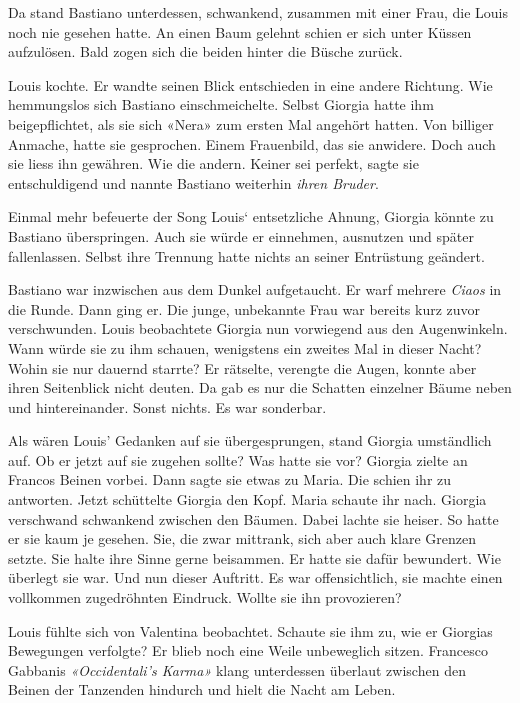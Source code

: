Da stand Bastiano unterdessen, schwankend, zusammen mit einer Frau, die Louis noch nie gesehen hatte. An einen Baum gelehnt schien er sich
unter Küssen aufzulösen. Bald zogen sich die beiden hinter die Büsche zurück.

Louis kochte. Er wandte seinen Blick entschieden in eine andere Richtung. Wie hemmungslos sich Bastiano einschmeichelte. Selbst Giorgia hatte ihm beigepflichtet, als sie sich «Nera» zum ersten Mal angehört hatten. Von billiger Anmache, hatte sie gesprochen. Einem Frauenbild, das sie anwidere. Doch auch sie liess ihn gewähren. Wie die andern. Keiner sei perfekt, sagte sie entschuldigend und nannte Bastiano weiterhin \emph{ihren Bruder}. 

Einmal mehr befeuerte der Song Louis` entsetzliche Ahnung, Giorgia könnte zu Bastiano überspringen. Auch sie würde er einnehmen, ausnutzen und später fallenlassen. Selbst ihre Trennung hatte nichts an seiner Entrüstung geändert. 

\sectionbreak

Bastiano war inzwischen aus dem Dunkel aufgetaucht. Er warf mehrere \emph{Ciaos} in die Runde. Dann ging er. Die junge, unbekannte Frau war bereits kurz zuvor verschwunden.
Louis beobachtete Giorgia nun vorwiegend aus den Augenwinkeln. Wann würde sie zu ihm schauen, wenigstens ein zweites Mal in dieser Nacht? Wohin sie nur dauernd starrte? Er rätselte, verengte die Augen, konnte aber ihren Seitenblick nicht deuten. Da gab es nur die Schatten einzelner Bäume neben und hintereinander. Sonst nichts. Es war sonderbar.

Als wären Louis’ Gedanken auf sie übergesprungen, stand Giorgia umständlich auf. Ob er jetzt auf sie zugehen sollte? 
Was hatte sie vor? Giorgia zielte an Francos Beinen vorbei. Dann sagte sie etwas zu Maria. Die schien ihr zu antworten. 
Jetzt schüttelte Giorgia den Kopf. Maria schaute ihr nach. Giorgia verschwand schwankend zwischen den Bäumen. Dabei lachte sie heiser.
So hatte er sie kaum je gesehen. Sie, die zwar mittrank, sich aber auch klare Grenzen setzte. Sie halte ihre Sinne gerne beisammen. Er hatte sie dafür bewundert. Wie überlegt sie war. Und nun dieser Auftritt. Es war offensichtlich, sie machte einen vollkommen zugedröhnten Eindruck.
Wollte sie ihn provozieren? 

Louis fühlte sich von Valentina beobachtet. Schaute sie ihm zu, wie er Giorgias Bewegungen verfolgte? Er blieb noch eine Weile unbeweglich sitzen.
Francesco Gabbanis \emph{«Occidentali’s Karma»} klang unterdessen überlaut zwischen den Beinen der Tanzenden hindurch und hielt die Nacht
am Leben.

